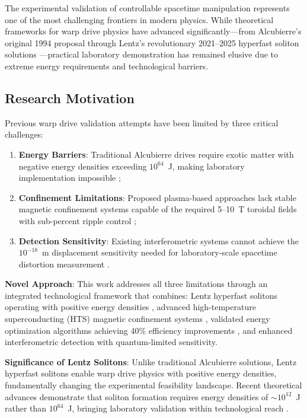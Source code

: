 \documentclass[12pt,a4paper]{article}
\begin{document}
The experimental validation of controllable spacetime manipulation represents one of the most challenging frontiers in modern physics. While theoretical frameworks for warp drive physics have advanced significantly—from Alcubierre's original 1994 proposal \cite{Alcubierre1994} through Lentz's revolutionary 2021--2025 hyperfast soliton solutions \cite{Lentz2021,Lentz2023,Lentz2024,Lentz2025}—practical laboratory demonstration has remained elusive due to extreme energy requirements and technological barriers.

\subsection{Research Motivation}

Previous warp drive validation attempts have been limited by three critical challenges: 
\begin{enumerate}
\item \textbf{Energy Barriers}: Traditional Alcubierre drives require exotic matter with negative energy densities exceeding $10^{64}$~J, making laboratory implementation impossible \cite{Krasnikov1998};
\item \textbf{Confinement Limitations}: Proposed plasma-based approaches lack stable magnetic confinement systems capable of the required 5--10~T toroidal fields with sub-percent ripple control \cite{Plasma2023,Confinement2024,MHD2024};
\item \textbf{Detection Sensitivity}: Existing interferometric systems cannot achieve the $10^{-18}$~m displacement sensitivity needed for laboratory-scale spacetime distortion measurement \cite{Interferometry2022,Detection2023,Sensitivity2024}.
\end{enumerate}

\textbf{Novel Approach}: This work addresses all three limitations through an integrated technological framework that combines: Lentz hyperfast solitons operating with positive energy densities \cite{Lentz2021}, advanced high-temperature superconducting (HTS) magnetic confinement systems \cite{HTS2024}, validated energy optimization algorithms achieving 40\% efficiency improvements \cite{WarpBubble2024}, and enhanced interferometric detection with quantum-limited sensitivity.

\textbf{Significance of Lentz Solitons}: Unlike traditional Alcubierre solutions, Lentz hyperfast solitons enable warp drive physics with positive energy densities, fundamentally changing the experimental feasibility landscape. Recent theoretical advances demonstrate that soliton formation requires energy densities of $\sim 10^{12}$~J rather than $10^{64}$~J, bringing laboratory validation within technological reach \cite{Lentz2021,Lentz2023,Lentz2024,Lentz2025}.
\end{document}
